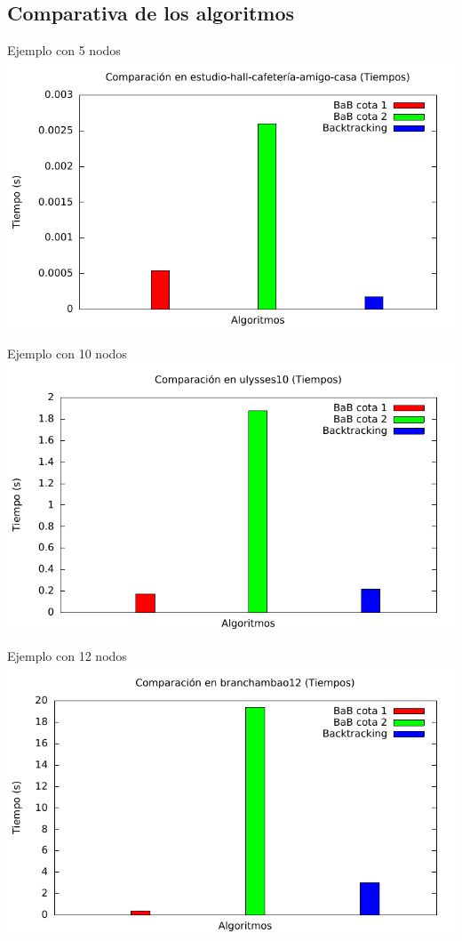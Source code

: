 \subsection{Comparativa de los algoritmos}

\begin{frame}{Ejemplo con 5 nodos}
\includegraphics[width=\textwidth]{img/barras_e-h-c-a-c5_t}
\end{frame}

\begin{frame}{Ejemplo con 10 nodos}
\includegraphics[width=\textwidth]{img/barras_ulysses10_t}
\end{frame}

\begin{frame}{Ejemplo con 12 nodos}
\includegraphics[width=\textwidth]{img/barras_branchambao12_t}
\end{frame}


